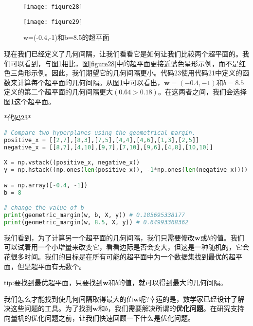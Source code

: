 \begin{figure}[ht]
    \begin{minipage}{.5\linewidth}
        \centering
	    \texttt{[image: figure28]}
	    \caption{w=(-0.4,-1)和b=8的超平面}
	    \label{figure28}
    \end{minipage}
    \begin{minipage}{.5\linewidth}
        \centering
	    \texttt{[image: figure29]}
	    \caption{w=(-0.4,-1)和b=8.5的超平面}
	    \label{figure29}
    \end{minipage}
	
\end{figure}


现在我们已经定义了几何间隔，让我们看看它是如何让我们比较两个超平面的。我们可以看到，与图\ref{figure29}相比，图\ref{figure28}中的超平面更接近蓝色星形示例，而不是红色三角形示例。因此，我们期望它的几何间隔更小。代码23使用代码21中定义的函数来计算每个超平面的几何间隔。从图\ref{figure29}中可以看出，$\mathbf{w}=(-0.4,-1)$和$b=8.5$定义的第二个超平面的几何间隔更大$(0.64 > 0.18)$。在这两者之间，我们会选择图\ref{figure29}这个超平面。

*代码23*

\begin{lstlisting}[language=python]
# Compare two hyperplanes using the geometrical margin. 
positive_x = [[2,7],[8,3],[7,5],[4,4],[4,6],[1,3],[2,5]] 
negative_x = [[8,7],[4,10],[9,7],[7,10],[9,6],[4,8],[10,10]] 

X = np.vstack((positive_x, negative_x)) 
y = np.hstack((np.ones(len(positive_x)), -1*np.ones(len(negative_x)))) 

w = np.array([-0.4, -1]) 
b = 8 

# change the value of b 
print(geometric_margin(w, b, X, y)) # 0.185695338177 
print(geometric_margin(w, 8.5, X, y)) # 0.64993368362
\end{lstlisting}

我们看到，为了计算另一个超平面的几何间隔，我们只需要修改$\mathbf{w}$或$b$的值。我们可以试着用一个小增量来改变它，看看边际是否会变大，但这是一种随机的，它会花很多时间。我们的目标是在所有可能的超平面中为一个数据集找到最优的超平面，但是超平面有无数个。

tip:要找到最优超平面，只要找到$\mathbf{w}$和$b$的值，就可以得到最大的几何间隔。

我们怎么才能找到使几何间隔取得最大的值$\mathbf{w}$呢?幸运的是，数学家已经设计了解决这些问题的工具。为了找到$\mathbf{w}$和$b$，我们需要解决所谓的\textbf{优化问题}。在研究支持向量机的优化问题之前，让我们快速回顾一下什么是优化问题。

